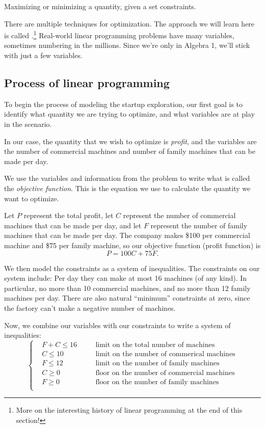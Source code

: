 \begin{boxeddef}[Optimization]
Maximizing or minimizing a quantity, given a set constraints.
\end{boxeddef}

There are multiple techniques for optimization. The approach we will learn here is called .\footnote{More on the interesting history of linear programming at the end of this section!} Real-world linear programming problems have many variables, sometimes numbering in the millions. Since we're only in Algebra 1, we'll stick with just a few variables.

\subsection{Process of linear programming}

To begin the process of modeling the startup exploration, our first goal is to identify what quantity we are trying to optimize, and what variables are at play in the scenario.

In our case, the quantity that we wish to optimize is \textit{profit}, and the variables are the number of commercial machines and number of family machines that can be made per day.

We use the variables and information from the problem to write what is called the \textit{objective function}. This is the equation we use to calculate the quantity we want to optimize.

Let $P$ represent the total profit, let $C$ represent the number of commercial machines that can be made per day, and let $F$ represent the number of family machines that can be made per day. The company makes \$100 per commercial machine and \$75 per family machine, so our objective function (profit function) is\[P = 100C + 75F.\]

We then model the constraints as a system of inequalities. The constraints on our system include: Per day they can make at most 16 machines (of any kind). In particular, no more than 10 commercial machines, and no more than 12 family machines per day. There are also natural ``minimum'' constraints at zero, since the factory can't make a negative number of machines.

Now, we combine our variables with our constraints to write a system of inequalities:
\[\left\{ \begin{aligned}
&F + C \leq 16	&&\quad\text{limit on the total number of machines}\\
&C \leq 10		&&\quad\text{limit on the number of commerical machines}\\
&F \leq 12		&&\quad\text{limit on the number of family machines}\\
&C \geq 0		&&\quad\text{floor on the number of commercial machines}\\
&F \geq 0		&&\quad\text{floor on the number of family machines}\\
\end{aligned}\right.\]

